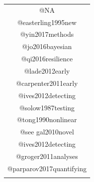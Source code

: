 \documentclass[12pt,twoside,openany]{reedthesis}
\begin{document}
\begin{longtable}[]{@{}c@{}}
\begin{minipage}[t]{0.44\columnwidth}
@NA\strut
\end{minipage}\tabularnewline
\begin{minipage}[t]{0.44\columnwidth}\centering\strut
@easterling1995new\strut
\end{minipage}\tabularnewline
\begin{minipage}[t]{0.44\columnwidth}\centering\strut
@yin2017methods\strut
\end{minipage}\tabularnewline
\begin{minipage}[t]{0.44\columnwidth}\centering\strut
@jo2016bayesian\strut
\end{minipage}\tabularnewline
\begin{minipage}[t]{0.44\columnwidth}\centering\strut
@qi2016resilience\strut
\end{minipage}\tabularnewline
\begin{minipage}[t]{0.44\columnwidth}\centering\strut
@lade2012early\strut
\end{minipage}\tabularnewline
\begin{minipage}[t]{0.44\columnwidth}\centering\strut
@carpenter2011early\strut
\end{minipage}\tabularnewline
\begin{minipage}[t]{0.44\columnwidth}\centering\strut
@ives2012detecting\strut
\end{minipage}\tabularnewline
\begin{minipage}[t]{0.44\columnwidth}\centering\strut
@solow1987testing\strut
\end{minipage}\tabularnewline
\begin{minipage}[t]{0.44\columnwidth}\centering\strut
@tong1990nonlinear\strut
\end{minipage}\tabularnewline
\begin{minipage}[t]{0.44\columnwidth}\centering\strut
@see gal2010novel\strut
\end{minipage}\tabularnewline
\begin{minipage}[t]{0.44\columnwidth}\centering\strut
@ives2012detecting\strut
\end{minipage}\tabularnewline
\begin{minipage}[t]{0.44\columnwidth}\centering\strut
@groger2011analyses\strut
\end{minipage}\tabularnewline
\begin{minipage}[t]{0.44\columnwidth}\centering\strut
@parparov2017quantifying\strut
\end{minipage}\tabularnewline
\begin{minipage}[t]{0.44\columnwidth}\centering\strut

\end{minipage}
\end{longtable}
\end{document}
